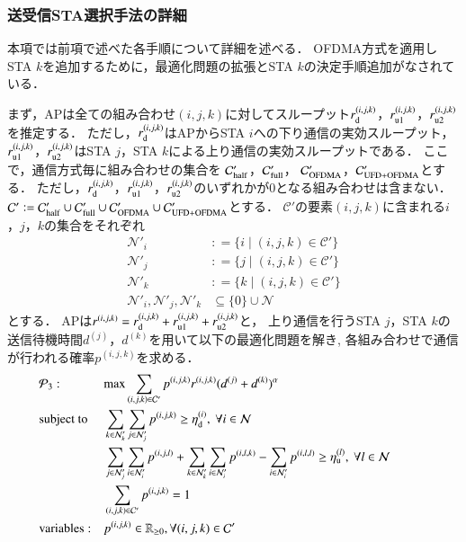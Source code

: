 \documentclass[technicalreport]{ieicej}
\def\equiv{\mathrel{\mathop:}=}
\newcommand{\sijk}{(i,j,k)}
\newcommand{\rijk}{r^{(i,j,k)}}
\newcommand{\mthcd}{{\mathcal C}'}
\newcommand{\mthni}{{\mathcal N}'_i}
\newcommand{\mthnj}{{\mathcal N}'_j}
\newcommand{\mthnk}{{\mathcal N}'_k}
\begin{document}
		\subsubsection{送受信STA選択手法の詳細}
			本項では前項で述べた各手順について詳細を述べる．
			OFDMA方式を適用しSTA $k$を追加するために，最適化問題の拡張とSTA $k$の決定手順追加がなされている．
			\par
			まず，APは全ての組み合わせ$(i,j,k)$に対してスループット$r^{(i,j,k)}_{\rm d}$，$r^{(i,j,k)}_{\rm u1}$，$r^{(i,j,k)}_{\rm u2}$を推定する．
			ただし，$r^{(i,j,k)}_{\rm d}$はAPからSTA $i$への下り通信の実効スループット，$r^{(i,j,k)}_{\rm u1}$，$r^{(i,j,k)}_{\rm u2}$はSTA $j$，STA $k$による上り通信の実効スループットである．
			ここで，通信方式毎に組み合わせの集合を
			${\mathcal C}'_{\rm half}$，${\mathcal C}'_{\rm full}$，
			${\mathcal C}'_{\rm OFDMA}$，${\mathcal C}'_{\rm UFD+OFDMA}$とする．
			ただし，$r^{(i,j,k)}_{\rm d}$，$r^{(i,j,k)}_{\rm u1}$，$r^{(i,j,k)}_{\rm u2}$のいずれかが0となる組み合わせは含まない．
			${\mathcal C}'\equiv{\mathcal C}'_{\rm half}\cup{\mathcal C}'_{\rm full}\cup{\mathcal C}'_{\rm OFDMA}\cup{\mathcal C}'_{\rm UFD+OFDMA}$とする．
			$\mthcd$の要素$\sijk$に含まれる$i$，$j$，$k$の集合をそれぞれ
			\begin{align}
				\mthni &\equiv\{i\mid\sijk\in\mthcd\}\\
				\mthnj &\equiv\{j\mid\sijk\in\mthcd\}\\
				\mthnk &\equiv\{k\mid\sijk\in\mthcd\}\\
				\mthni,\mthnj,\mthnk&\subseteq \{0\}\cup{\mathcal N}
			\end{align}
			とする．
			APは$\rijk=r^{(i,j,k)}_{\rm d}+r^{(i,j,k)}_{\rm u1}+r^{(i,j,k)}_{\rm u2}$と，
			上り通信を行うSTA $j$，STA $k$の送信待機時間$d^{(j)}$，$d^{(k)}$を用いて以下の最適化問題を解き,
			各組み合わせで通信が行われる確率$p^{(i,j,k)}$を求める．
			\begin{align}
				&{\mathcal P}_3: && {\rm max} \sum_{(i,j,k)\in{\mathcal C}'} p^{(i,j,k)}r^{(i,j,k)}(d^{(j)}+d^{(k)})^{\alpha} &&&&&&\\
				&{\rm subject\ to} && \sum_{k\in\mthnk} \sum_{j\in\mthnj} p^{(i,j,k)} \geq \eta_{\rm d}^{(i)},\ \forall i\in {\mathcal N} \label{eq:etad} \\
				&&& \sum_{j\in\mthnj} \sum_{i\in\mthni} p^{(i,j,l)}+\sum_{k\in\mthnk} \sum_{i\in\mthni} p^{(i,l,k)}- \sum_{i\in\mthni} p^{(i,l,l)} \geq \eta_{\rm u}^{(l)},\ \forall l\in {\mathcal N} \label{eq:etau} \\
				&&& \sum_{(i,j,k)\in{\mathcal C}'} p^{(i,j,k)}=1 \\
				&{\rm variables:} &&p^{(i,j,k)} \in {\mathbb R}_{\geq 0},\forall(i,j,k)\in {\mathcal C}'
			\end{align}
\end{document}
